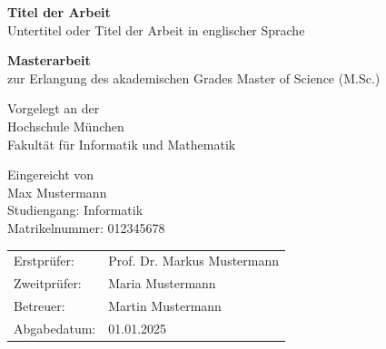 \begin{titlepage}
  \thispagestyle{empty}


  \vspace{2cm}

  \begin{center}
    {\LARGE \textbf{Titel der Arbeit} \\}
    \vspace{0.5cm}
    {\large Untertitel oder Titel der Arbeit in englischer Sprache}

    \vspace{1.2cm}
    {\large \textbf{Masterarbeit} \\}
    \vspace{0.2cm}
    zur Erlangung des akademischen Grades Master of Science (M.Sc.)

    \vspace{1.2cm}
    Vorgelegt an der \\
    Hochschule München \\
    Fakultät für Informatik und Mathematik

    \vspace{1.2cm}
    Eingereicht von \\
    Max Mustermann \\
    Studiengang: Informatik\\
    Matrikelnummer: 012345678
  \end{center}

  \vfill

  \begingroup
  \renewcommand{\arraystretch}{1.0}
  \begin{tabular}{@{}ll@{}}
    Erstprüfer:  & Prof. Dr. Markus Mustermann \\
    Zweitprüfer: & Maria Mustermann            \\
    Betreuer:    & Martin Mustermann           \\
    Abgabedatum: & 01.01.2025                  \\
  \end{tabular}
  \endgroup

\end{titlepage}
\addtocounter{page}{1}
